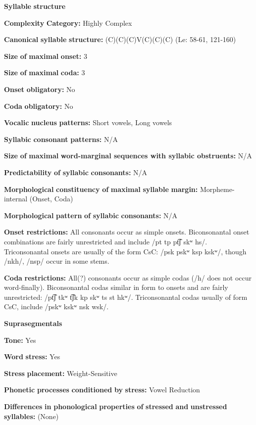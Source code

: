 \begin{styleBody}
\textbf{Syllable} \textbf{structure}

\textbf{Complexity} \textbf{Category:} Highly Complex

\textbf{Canonical} \textbf{syllable} \textbf{structure:} (C)(C)(C)V(C)(C)(C) (Le\citealt{Sourd1993}: 58-61, 121-160)

\textbf{Size} \textbf{of} \textbf{maximal} \textbf{onset:} 3

\textbf{Size} \textbf{of} \textbf{maximal} \textbf{coda:} 3

\textbf{Onset} \textbf{obligatory:} No

\textbf{Coda} \textbf{obligatory:} No

\textbf{Vocalic} \textbf{nucleus} \textbf{patterns:} Short vowels, Long vowels

\textbf{Syllabic} \textbf{consonant} \textbf{patterns:} N/A

\textbf{Size} \textbf{of} \textbf{maximal} \textbf{word{}-marginal sequences with syllabic obstruents:} N/A

\textbf{Predictability} \textbf{of} \textbf{syllabic} \textbf{consonants:} N/A

\textbf{Morphological} \textbf{constituency} \textbf{of} \textbf{maximal} \textbf{syllable} \textbf{margin:} Morpheme-internal (Onset, Coda)

\textbf{Morphological} \textbf{pattern} \textbf{of} \textbf{syllabic} \textbf{consonants:} N/A

\textbf{Onset} \textbf{restrictions:} All consonants occur as simple onsets. Biconsonantal onset combinations are fairly unrestricted and include /pt tp pt͡ʃ skʷ hs/. Triconsonantal onsets are usually of the form CsC: /psk pskʷ ksp kskʷ/, though /nkh/, /nsp/ occur in some stems.

\textbf{Coda} \textbf{restrictions:} All(?) consonants occur as simple codas (/h/ does not occur word-finally). Biconsonantal codas similar in form to onsets and are fairly unrestricted: /pt͡ʃ tkʷ t͡ʃk kp skʷ ts st hkʷ/. Triconsonantal codas usually of form CsC, include /pskʷ kskʷ nsk wsk/.

\textbf{Suprasegmentals}

\textbf{Tone:} Yes

\textbf{Word} \textbf{stress:} Yes

\textbf{Stress} \textbf{placement:} Weight-Sensitive

\textbf{Phonetic} \textbf{processes} \textbf{conditioned} \textbf{by} \textbf{stress:} Vowel Reduction

\textbf{Differences} \textbf{in} \textbf{phonological} \textbf{properties} \textbf{of} \textbf{stressed} \textbf{and} \textbf{unstressed} \textbf{syllables:} (None)


\end{styleBody}
